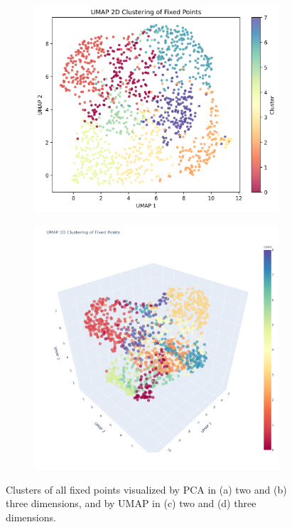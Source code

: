 \documentclass[a4paper,12pt]{article}
\begin{document}
\begin{figure}[H]
\begin{subfigure}{0.45\textwidth}
	\caption{}
\end{subfigure}
\hfill
\begin{subfigure}{0.45\textwidth}
	\includegraphics[width=\textwidth,height=\textwidth]{UMAP-2D}
	\caption{}
\end{subfigure}
\hfill
\begin{subfigure}{0.45\textwidth}
	\includegraphics[width=\textwidth,height=\textwidth]{UMAP-3D}
	\caption{}
\end{subfigure}
\caption{Clusters of all fixed points visualized by PCA in (a) two and (b) three dimensions, and by UMAP in (c) two and (d) three dimensions.}
\label{fig:all-fixed-points}
\end{figure}
\end{document}
